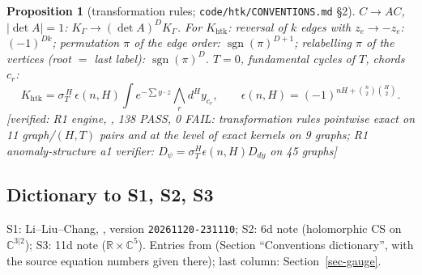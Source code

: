 \documentclass[10pt,a4paper]{article}
\numberwithin{equation}{section}
\newtheorem{proposition}[theorem]{Proposition}
\theoremstyle{definition}
\theoremstyle{remark}
\newcommand{\sgn}{\operatorname{sgn}}
\newcommand{\ver}[1]{\textup{[verified: #1]}}
\newcommand{\htk}{\mathrm{htk}}
\begin{document}
\begin{proposition}[transformation rules; \texttt{code/htk/CONVENTIONS.md} \S2]\label{prop-rules}
$C\to AC$, $|\det A|=1$: $K_\Gamma\to(\det A)^{D}K_\Gamma$. For $K_\htk$: reversal of $k$ edges with $z_e\to-z_e$: $(-1)^{Dk}$; permutation $\pi$ of the edge order: $\sgn(\pi)^{D+1}$; relabelling $\pi$ of the vertices (root $=$ last label): $\sgn(\pi)^D$. $T=0$, fundamental cycles of $T$, chords $c_r$:
\begin{equation}
K_\htk=\sigma_T^{\,H}\,\epsilon(n,H)\int e^{-\sum y\cdot z}\bigwedge_rd^Hy_{c_r},\qquad \epsilon(n,H)=(-1)^{nH+\binom n2\binom H2}.
\end{equation}
\ver{R1 engine, , 138 PASS, 0 FAIL: transformation rules pointwise exact on 11 graph/$(H,T)$ pairs and at the level of exact kernels on 9 graphs; R1 anomaly-structure a1 verifier: $D_\psi=\sigma_T^H\epsilon(n,H)D_{dy}$ on 45 graphs}
\end{proposition}

\subsection{Dictionary to S1, S2, S3}\label{sec-dict}

S1: Li--Liu--Chang, , version \texttt{20261120-231110}; S2: 6d note (holomorphic CS on $\mathbb C^{3|2}$); S3: 11d note ($\mathbb R\times\mathbb C^5$). Entries from  (Section ``Conventions dictionary'', with the source equation numbers given there); last column: Section~\ref{sec-gauge}.
\end{document}
